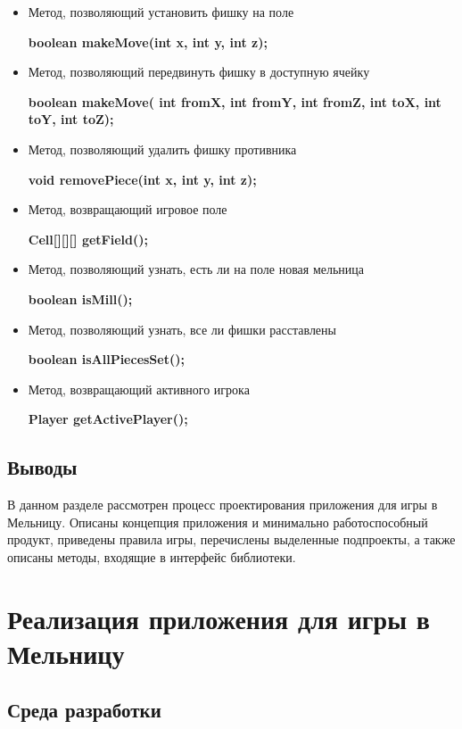 \documentclass[a4paper]{article}
\begin{document}
\begin{itemize}

\item Метод, позволяющий установить фишку на поле

\textbf{boolean makeMove(int x, int y, int z);}

\item Метод, позволяющий передвинуть фишку в доступную ячейку

\textbf{boolean makeMove( int fromX, int fromY, int fromZ, int toX, int toY, int toZ);}

\item Метод, позволяющий удалить фишку противника

\textbf{void removePiece(int x, int y, int z);}

\item Метод, возвращающий игровое поле

\textbf{Cell[][][] getField();}

\item Метод, позволяющий узнать, есть ли на поле новая мельница

\textbf{boolean isMill();}

\item Метод, позволяющий узнать, все ли фишки расставлены

\textbf{boolean isAllPiecesSet();}

\item Метод, возвращающий активного игрока

\textbf{Player getActivePlayer();}

\end{itemize}

\subsection{Выводы}

В данном разделе рассмотрен процесс проектирования приложения для игры в Мельницу. Описаны концепция приложения и минимально работоспособный продукт, приведены правила игры, перечислены выделенные подпроекты, а также описаны методы, входящие в интерфейс библиотеки. 

\section{Реализация приложения для игры в Мельницу}

\subsection{Среда разработки}
\end{document}
